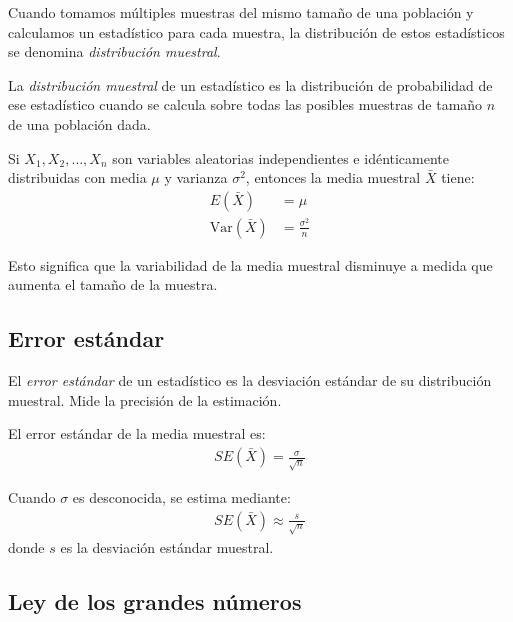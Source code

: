 Cuando tomamos múltiples muestras del mismo tamaño de una población y calculamos un estadístico para cada muestra, la distribución de estos estadísticos se denomina \emph{distribución muestral}.

\begin{definicion}
	\label{def:5.1.2}
	La \emph{distribución muestral} de un estadístico es la distribución de probabilidad de ese estadístico cuando se calcula sobre todas las posibles muestras de tamaño $n$ de una población dada.
\end{definicion}

\begin{ejemplo}
	\label{exmp:5.1.2}
	Si $X_1, X_2, \ldots, X_n$ son variables aleatorias independientes e idénticamente distribuidas con media $\mu$ y varianza $\sigma^2$, entonces la media muestral $\bar{X}$ tiene:
	\begin{align}
		E(\bar{X}) &= \mu \\
		\text{Var}(\bar{X}) &= \frac{\sigma^2}{n}
	\end{align}

	Esto significa que la variabilidad de la media muestral disminuye a medida que aumenta el tamaño de la muestra.
\end{ejemplo}

\subsection*{Error estándar}

El \emph{error estándar} de un estadístico es la desviación estándar de su distribución muestral. Mide la precisión de la estimación.

\begin{definicion}
	\label{def:5.1.3}
	El error estándar de la media muestral es:
	\begin{align}
		SE(\bar{X}) = \frac{\sigma}{\sqrt{n}}
	\end{align}

	Cuando $\sigma$ es desconocida, se estima mediante:
	\begin{align}
		SE(\bar{X}) \approx \frac{s}{\sqrt{n}}
	\end{align}
	donde $s$ es la desviación estándar muestral.
\end{definicion}

\subsection*{Ley de los grandes números}

